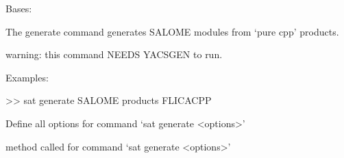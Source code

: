 \documentclass[a4paper,10pt,english]{sphinxmanual}
\begin{document}
\begin{fulllineitems}
\label{\detokenize{apidoc_commands/commands:commands.generate.Command}}
Bases: 

The generate command generates SALOME modules from ‘pure cpp’ products.

\begin{DUlineblock}{0em}
\item[] warning: this command NEEDS YACSGEN to run.
\item[] 
\item[] Examples:
\item[] \textgreater{}\textgreater{} sat generate SALOME \textendash{}products FLICACPP
\end{DUlineblock}

\begin{fulllineitems}
\label{\detokenize{apidoc_commands/commands:commands.generate.Command.getParser}}
Define all options for command ‘sat generate \textless{}options\textgreater{}’

\end{fulllineitems}


\begin{fulllineitems}
\label{\detokenize{apidoc_commands/commands:commands.generate.Command.name}}
\end{fulllineitems}


\begin{fulllineitems}
\label{\detokenize{apidoc_commands/commands:commands.generate.Command.run}}
method called for command ‘sat generate \textless{}options\textgreater{}’

\end{fulllineitems}


\end{fulllineitems}
\end{document}
